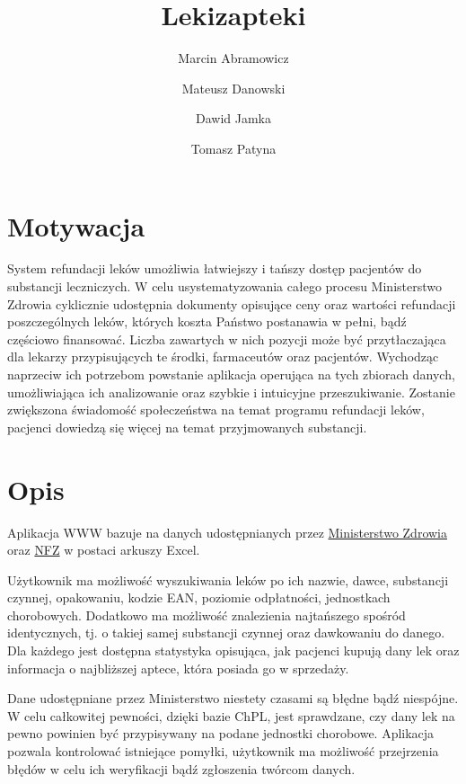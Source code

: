 \documentclass{article}
\title{Lekizapteki}
\author{Marcin Abramowicz \and Mateusz Danowski \and Dawid Jamka \and Tomasz Patyna}
\begin{document}
  \maketitle


  \section{Motywacja}

  System refundacji leków umożliwia łatwiejszy i tańszy dostęp pacjentów do substancji leczniczych.
  W celu usystematyzowania całego procesu Ministerstwo Zdrowia cyklicznie udostępnia dokumenty opisujące ceny oraz wartości refundacji poszczególnych leków, których koszta Państwo postanawia w pełni, bądź częściowo finansować.
  Liczba zawartych w nich pozycji może być przytłaczająca dla lekarzy przypisujących te środki, farmaceutów oraz pacjentów.
  Wychodząc naprzeciw ich potrzebom powstanie aplikacja operująca na tych zbiorach danych, umożliwiająca ich analizowanie oraz szybkie i intuicyjne przeszukiwanie.
  Zostanie zwiększona świadomość społeczeństwa na temat programu refundacji leków, pacjenci dowiedzą się więcej na temat przyjmowanych substancji.


  \section{Opis}

  Aplikacja WWW bazuje na danych udostępnianych przez
  \href{https://www.gov.pl/web/zdrowie/obwieszczenia-ministra-zdrowia-lista-lekow-refundowanych?fbclid=IwAR1U3YB3yON5EN2s1qdYRbcIeh7iDxqeOtQoEYGFvX9ozGDWdURIK2JOMRs}
  {Ministerstwo Zdrowia}
  oraz \href{https://www.nfz.gov.pl/aktualnosci/aktualnosci-centrali/komunikat-dgl,7465.html?fbclid=IwAR0F41XjLwTg7XQdUjeYpE_KS4VVZk50etlbYDpwxhxOR2ZLdslMatUtbEU}{NFZ}
  w postaci arkuszy Excel.

  Użytkownik ma możliwość wyszukiwania leków po ich nazwie, dawce, substancji czynnej, opakowaniu, kodzie EAN, poziomie odpłatności, jednostkach chorobowych.
  Dodatkowo ma możliwość znalezienia najtańszego spośród identycznych, tj. o takiej samej substancji czynnej oraz dawkowaniu do danego.
  Dla każdego jest dostępna statystyka opisująca, jak pacjenci kupują dany lek oraz informacja o najbliższej aptece, która posiada go w sprzedaży.

  Dane udostępniane przez Ministerstwo niestety czasami są błędne bądź niespójne.
  W celu całkowitej pewności, dzięki bazie ChPL, jest sprawdzane, czy dany lek na pewno powinien być przypisywany na podane jednostki chorobowe.
  Aplikacja pozwala kontrolować istniejące pomyłki, użytkownik ma możliwość przejrzenia błędów w celu ich weryfikacji bądź zgłoszenia twórcom danych.
\end{document}
